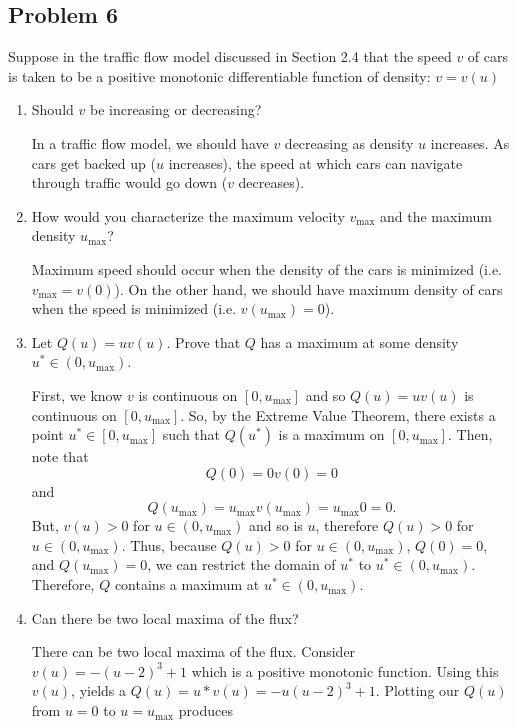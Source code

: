 \documentclass[a4paper,12pt]{article}
\begin{document}
\subsection*{Problem 6}
	Suppose in the traffic flow model discussed in Section 2.4 that the speed $ v $ of cars is taken to be a positive monotonic differentiable function of density: $ v = v(u) $
	\begin{enumerate}[label = \textbf{(\alph*)}]
		\item Should $ v $ be increasing or decreasing?
		
		In a traffic flow model, we should have $ v $ decreasing as density $ u $ increases. As cars get backed up ($ u $ increases), the speed at which cars can navigate through traffic would go down ($ v $ decreases).
		
		\item How would you characterize the maximum velocity $ v_\text{max} $ and the maximum density $ u_\text{max} $?
		
		Maximum speed should occur when the density of the cars is minimized (i.e. $ v_{\text{max}} = v(0) $). On the other hand, we should have maximum density of cars when the speed is minimized (i.e. $ v(u_\text{max}) = 0 $).
		
		\item Let $ Q(u) = u v(u) $. Prove that $ Q $ has a maximum at some density $ u^* \in (0,u_\text{max})$.
		
		First, we know $ v $ is continuous on $ [0, u_\text{max}] $ and so $ Q(u) = u v(u) $ is continuous on $ [0, u_\text{max}] $. So, by the Extreme Value Theorem, there exists a point $ u^* \in [0,u_\text{max}] $ such that $ Q(u^*) $ is a maximum on $ [0, u_\text{max}] $. Then, note that 
		\[
			Q(0) = 0 v(0) = 0
		\]
		and
		\[
			Q(u_\text{max})  = u_\text{max} v(u_\text{max}) = u_\text{max} 0 = 0.
		\]
		 But, $ v(u) > 0$ for $ u \in (0, u_\text{max}) $ and so is $ u $, therefore $ Q(u) > 0 $ for $ u \in (0, u_\text{max}) $. Thus, because $ Q(u) > 0 $ for $u \in (0, u_\text{max})$, $ Q(0) = 0 $, and $ Q(u_\text{max}) = 0 $, we can restrict the domain of $ u^* $ to $ u^* \in (0, u_\text{max}) $. Therefore, $ Q $ contains a maximum at $u^* \in (0, u_\text{max})$.
		
		\item Can there be two local maxima of the flux?
        
        There can be two local maxima of the flux. Consider $ v(u) = -(u - 2)^3 + 1 $ which is a positive monotonic function. Using this $ v(u) $, yields a $ Q(u) = u*v(u) =  -u(u - 2)^3 + 1 $. Plotting our $ Q(u) $ from $ u = 0 $ to $ u = u_\text{max} $ produces
        

\end{enumerate}
\end{document}
